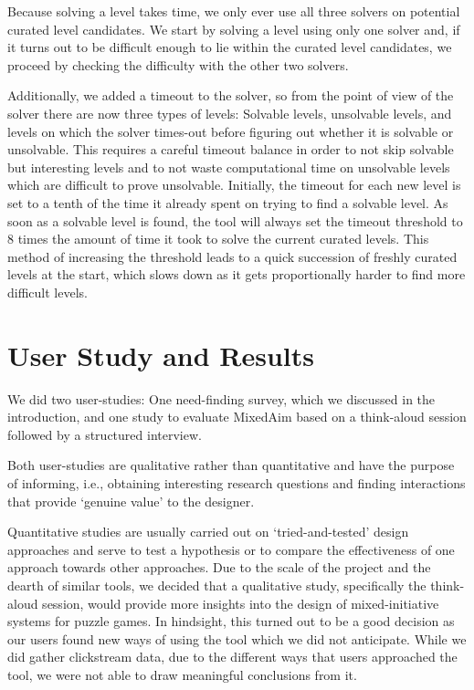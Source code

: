 Because solving a level takes time, we only ever use all three solvers on potential curated level candidates. We start by solving a level using only one solver and, if it turns out to be difficult enough to lie within the curated level candidates, we proceed by checking the difficulty with the other two solvers.

Additionally, we added a timeout to the solver, so from the point of view of the solver there are now three types of levels: Solvable levels, unsolvable levels, and levels on which the solver times-out before figuring out whether it is solvable or unsolvable.
This requires a careful timeout balance in order to not skip solvable but interesting levels and to not waste computational time on unsolvable levels which are difficult to prove unsolvable.
Initially, the timeout for each new level is set to a tenth of the time it already spent on trying to find a solvable level. As soon as a solvable level is found, the tool will always set the timeout threshold to 8 times the amount of time it took to solve the current curated levels. This method of increasing the threshold leads to a quick succession of freshly curated levels at the start, which slows down as it gets proportionally harder to find more difficult levels.


\chapter{User Study and Results}

We did two user-studies: One need-finding survey, which we discussed in the introduction, and one study to evaluate MixedAim based on a think-aloud session followed by a structured interview. 

Both user-studies are qualitative rather than quantitative and have the purpose of informing, i.e., obtaining interesting research questions and finding interactions that provide `genuine value' to the designer. 

Quantitative studies are usually carried out on `tried-and-tested' design approaches and serve to test a hypothesis or to compare the effectiveness of one approach towards other approaches.
Due to the scale of the project and the dearth of similar tools, we decided that a qualitative study, specifically the think-aloud session, would provide more insights into the design of mixed-initiative systems for puzzle games. In hindsight, this turned out to be a good decision as our users found new ways of using the tool which we did not anticipate.
While we did gather clickstream data, due to the different ways that users approached the tool, we were not able to draw meaningful conclusions from it. 

